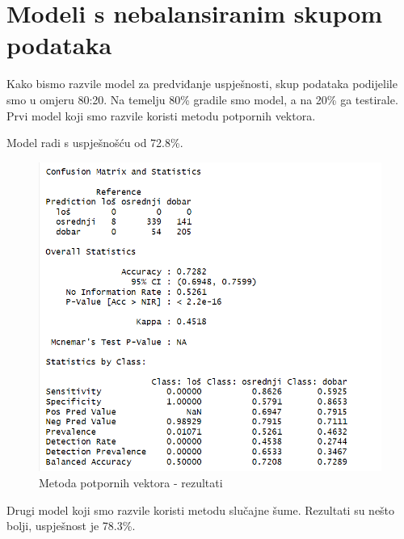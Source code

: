 \section{Modeli s nebalansiranim skupom podataka}
Kako bismo razvile model za predviđanje uspješnosti, skup podataka podijelile smo u omjeru 80:20. Na temelju 80\% gradile smo model, a na 20\% ga testirale. \\
Prvi model koji smo razvile koristi metodu potpornih vektora. 



Model radi s uspješnošću od 72.8\%.

\begin{figure}[H]
	\centering
	\includegraphics[width=15cm]{../figures/expl/002.png}
	\caption{Metoda potpornih vektora - rezultati}
	\label{fig:ml2}
\end{figure}

Drugi model koji smo razvile koristi metodu slučajne šume. Rezultati su nešto bolji, uspješnost je 78.3\%.



